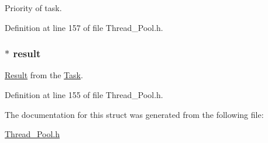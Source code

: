 Priority of task. 



Definition at line 157 of file Thread\+\_\+\+Pool.\+h.

\hypertarget{struct_task_a47963d2c7f557db21790fb71b8cd20d6}{}
\subsubsection[{result}]{$\ast$ result}\label{struct_task_a47963d2c7f557db21790fb71b8cd20d6}


\hyperlink{struct_result}{Result} from the \hyperlink{struct_task}{Task}. 



Definition at line 155 of file Thread\+\_\+\+Pool.\+h.



The documentation for this struct was generated from the following file\+:\begin{DoxyCompactItemize}
\item 
\hyperlink{_thread___pool_8h}{Thread\+\_\+\+Pool.\+h}\end{DoxyCompactItemize}
